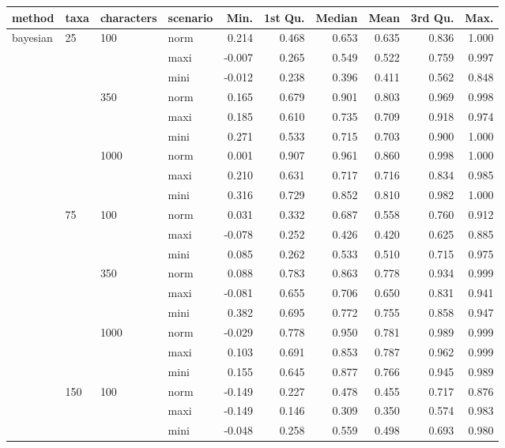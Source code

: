 \begin{longtable}{llllrrrrrr}
  \hline
method & taxa & characters & scenario & Min. & 1st Qu. & Median & Mean & 3rd Qu. & Max. \\ 
  \hline
bayesian & 25 & 100 & norm & 0.214 & 0.468 & 0.653 & 0.635 & 0.836 & 1.000 \\ 
   &  &  & maxi & -0.007 & 0.265 & 0.549 & 0.522 & 0.759 & 0.997 \\ 
   &  &  & mini & -0.012 & 0.238 & 0.396 & 0.411 & 0.562 & 0.848 \\ 
   &  & 350 & norm & 0.165 & 0.679 & 0.901 & 0.803 & 0.969 & 0.998 \\ 
   &  &  & maxi & 0.185 & 0.610 & 0.735 & 0.709 & 0.918 & 0.974 \\ 
   &  &  & mini & 0.271 & 0.533 & 0.715 & 0.703 & 0.900 & 1.000 \\ 
   &  & 1000 & norm & 0.001 & 0.907 & 0.961 & 0.860 & 0.998 & 1.000 \\ 
   &  &  & maxi & 0.210 & 0.631 & 0.717 & 0.716 & 0.834 & 0.985 \\ 
   &  &  & mini & 0.316 & 0.729 & 0.852 & 0.810 & 0.982 & 1.000 \\ 
   & 75 & 100 & norm & 0.031 & 0.332 & 0.687 & 0.558 & 0.760 & 0.912 \\ 
   &  &  & maxi & -0.078 & 0.252 & 0.426 & 0.420 & 0.625 & 0.885 \\ 
   &  &  & mini & 0.085 & 0.262 & 0.533 & 0.510 & 0.715 & 0.975 \\ 
   &  & 350 & norm & 0.088 & 0.783 & 0.863 & 0.778 & 0.934 & 0.999 \\ 
   &  &  & maxi & -0.081 & 0.655 & 0.706 & 0.650 & 0.831 & 0.941 \\ 
   &  &  & mini & 0.382 & 0.695 & 0.772 & 0.755 & 0.858 & 0.947 \\ 
   &  & 1000 & norm & -0.029 & 0.778 & 0.950 & 0.781 & 0.989 & 0.999 \\ 
   &  &  & maxi & 0.103 & 0.691 & 0.853 & 0.787 & 0.962 & 0.999 \\ 
   &  &  & mini & 0.155 & 0.645 & 0.877 & 0.766 & 0.945 & 0.989 \\ 
   & 150 & 100 & norm & -0.149 & 0.227 & 0.478 & 0.455 & 0.717 & 0.876 \\ 
   &  &  & maxi & -0.149 & 0.146 & 0.309 & 0.350 & 0.574 & 0.983 \\ 
   &  &  & mini & -0.048 & 0.258 & 0.559 & 0.498 & 0.693 & 0.980 \\ 

\end{longtable}
